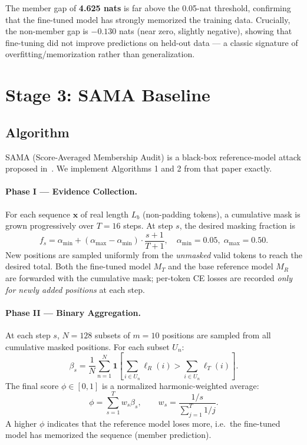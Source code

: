 \documentclass[11pt,a4paper]{article}
\begin{document}
The member gap of \textbf{4.625 nats} is far above the 0.05-nat threshold,
confirming that the fine-tuned model has strongly memorized the training data.
Crucially, the non-member gap is $-0.130$ nats (near zero, slightly negative),
showing that fine-tuning did not improve predictions on held-out data — a
classic signature of overfitting/memorization rather than generalization.

\section{Stage 3: SAMA Baseline}

\subsection{Algorithm}

SAMA (Score-Averaged Membership Audit) is a black-box reference-model attack
proposed in~\cite{sama}. We implement Algorithms 1 and 2 from that paper exactly.

\paragraph{Phase I --- Evidence Collection.}
For each sequence $\mathbf{x}$ of real length $L_b$ (non-padding tokens),
a cumulative mask is grown progressively over $T = 16$ steps.
At step $s$, the desired masking fraction is
\[
  f_s = \alpha_{\min} + (\alpha_{\max} - \alpha_{\min}) \cdot \frac{s+1}{T+1},
  \quad \alpha_{\min} = 0.05,\; \alpha_{\max} = 0.50.
\]
New positions are sampled uniformly from the \emph{unmasked} valid tokens
to reach the desired total.  Both the fine-tuned model $M_T$ and the base
reference model $M_R$ are forwarded with the cumulative mask; per-token CE
losses are recorded \emph{only for newly added positions} at each step.

\paragraph{Phase II --- Binary Aggregation.}
At each step $s$, $N = 128$ subsets of $m = 10$ positions are sampled from
all cumulative masked positions.  For each subset $U_n$:
\[
  \beta_s = \frac{1}{N}\sum_{n=1}^{N}
            \mathbf{1}\!\left[\sum_{i \in U_n} \ell_R(i) > \sum_{i \in U_n} \ell_T(i)\right].
\]
The final score $\phi \in [0,1]$ is a normalized harmonic-weighted average:
\[
  \phi = \sum_{s=1}^{T} w_s \beta_s, \qquad
  w_s = \frac{1/s}{\sum_{j=1}^{T} 1/j}.
\]
A higher $\phi$ indicates that the reference model loses more, i.e.\ the
fine-tuned model has memorized the sequence (member prediction).
\end{document}
